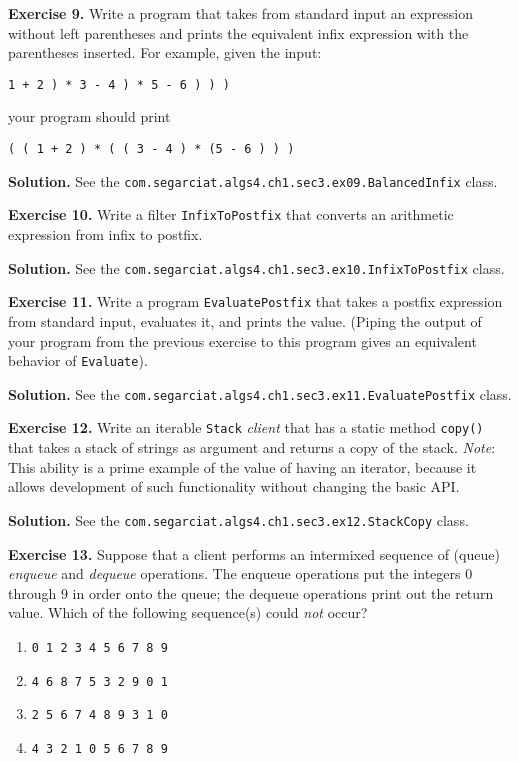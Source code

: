 \documentclass[12pt, a4paper]{article}
\newenvironment{ex}[2][Exercise]
{\par\medskip\noindent \textbf{#1 #2.}}
{\medskip}
\newenvironment{sol}[1][Solution]
{\par\medskip\noindent \textbf{#1.} }
{\medskip}
\begin{document}
	\begin{ex}{9}
		Write a program that takes from standard input an expression without left parentheses
		and prints the equivalent infix expression with the parentheses inserted. For example,
		given the input:
		\begin{lstlisting}[language={}]
		1 + 2 ) * 3 - 4 ) * 5 - 6 ) ) )
		\end{lstlisting}
		your program should print
		\begin{lstlisting}[language={}]
		( ( 1 + 2 ) * ( ( 3 - 4 ) * (5 - 6 ) ) )
		\end{lstlisting}
	\end{ex}
	\begin{sol}
		See the \texttt{com.segarciat.algs4.ch1.sec3.ex09.BalancedInfix} class.
	\end{sol}
	\begin{ex}{10}
		Write a filter \texttt{InfixToPostfix} that converts an arithmetic expression
		from infix to postfix.
	\end{ex}
	\begin{sol}
		See the \texttt{com.segarciat.algs4.ch1.sec3.ex10.InfixToPostfix} class.
	\end{sol}
	\begin{ex}{11}
		Write a program \texttt{EvaluatePostfix} that takes a postfix expression from
		standard input, evaluates it, and prints the value. (Piping the output of
		your program from the previous exercise to this program gives an equivalent
		behavior of \texttt{Evaluate}).
	\end{ex}
	\begin{sol}
		See the \texttt{com.segarciat.algs4.ch1.sec3.ex11.EvaluatePostfix} class.
	\end{sol}
	\begin{ex}{12}
		Write an iterable \texttt{Stack} \emph{client} that has a static method \texttt{copy()}
		that takes a stack of strings as argument and returns a copy of the stack.
		\emph{Note}: This ability is a prime example of the value of having an iterator,
		because it allows development of such functionality without changing the basic
		API.
	\end{ex}
	\begin{sol}
		See the \texttt{com.segarciat.algs4.ch1.sec3.ex12.StackCopy} class.
	\end{sol}
	\begin{ex}{13}
		Suppose that a client performs an intermixed sequence of (queue) \emph{enqueue}
		and \emph{dequeue} operations. The enqueue operations put the integers 0 through 9
		in order onto the queue; the dequeue operations print out the return value. Which
		of the following sequence(s) could \emph{not} occur?
		\begin{enumerate}[label=(\alph*)]
			\item \texttt{0 1 2 3 4 5 6 7 8 9}
			\item \texttt{4 6 8 7 5 3 2 9 0 1}
			\item \texttt{2 5 6 7 4 8 9 3 1 0}
			\item \texttt{4 3 2 1 0 5 6 7 8 9}
		\end{enumerate}
	\end{ex}
\end{document}
